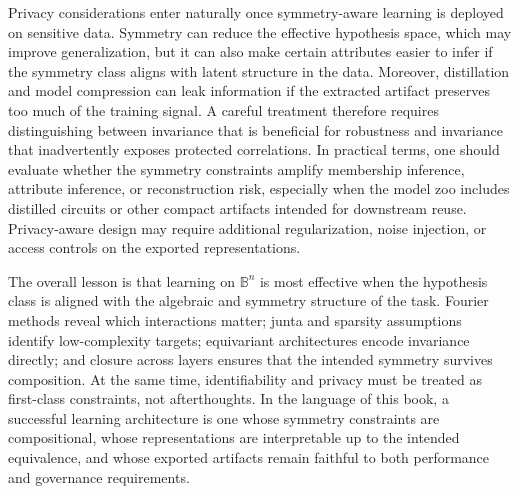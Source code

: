 Privacy considerations enter naturally once symmetry-aware learning is deployed on sensitive data. Symmetry can reduce the effective hypothesis space, which may improve generalization, but it can also make certain attributes easier to infer if the symmetry class aligns with latent structure in the data. Moreover, distillation and model compression can leak information if the extracted artifact preserves too much of the training signal. A careful treatment therefore requires distinguishing between invariance that is beneficial for robustness and invariance that inadvertently exposes protected correlations. In practical terms, one should evaluate whether the symmetry constraints amplify membership inference, attribute inference, or reconstruction risk, especially when the model zoo includes distilled circuits or other compact artifacts intended for downstream reuse. Privacy-aware design may require additional regularization, noise injection, or access controls on the exported representations.

The overall lesson is that learning on \(\mathbb{B}^n\) is most effective when the hypothesis class is aligned with the algebraic and symmetry structure of the task. Fourier methods reveal which interactions matter; junta and sparsity assumptions identify low-complexity targets; equivariant architectures encode invariance directly; and closure across layers ensures that the intended symmetry survives composition. At the same time, identifiability and privacy must be treated as first-class constraints, not afterthoughts. In the language of this book, a successful learning architecture is one whose symmetry constraints are compositional, whose representations are interpretable up to the intended equivalence, and whose exported artifacts remain faithful to both performance and governance requirements.
